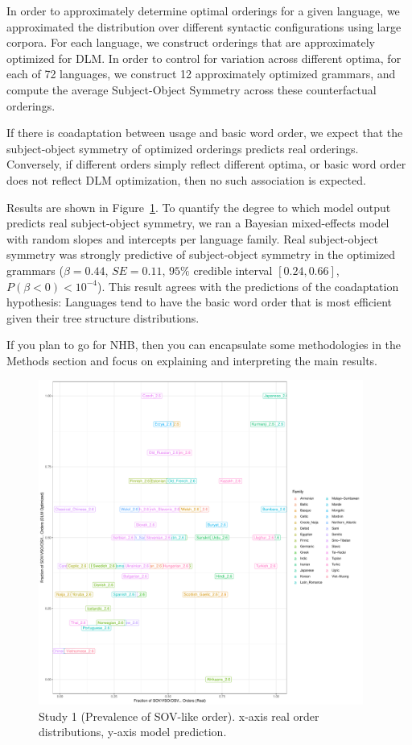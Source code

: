 \documentclass[11pt,a4paper]{article}
\begin{document}
In order to approximately determine optimal orderings for a given language, we approximated the distribution over different syntactic configurations using large corpora.
For each language, we construct orderings that are approximately optimized for DLM.
In order to control for variation across different optima, for each of 72 languages, we construct 12 approximately optimized grammars, and compute the average Subject-Object Symmetry across these counterfactual orderings.

If there is coadaptation between usage and basic word order, we expect that the subject-object symmetry of optimized orderings predicts real orderings.
Conversely, if different orders simply reflect different optima, or basic word order does not reflect DLM optimization, then no such association is expected.

Results are shown in Figure~\ref{fig:study1}.
To quantify the degree to which model output predicts real subject-object symmetry, we ran a Bayesian mixed-effects model with random slopes and intercepts per language family.
Real subject-object symmetry was strongly predictive of subject-object symmetry in the optimized grammars ($\beta = 0.44$, $SE=0.11$, $95\%$ credible interval $[0.24, 0.66]$, $P(\beta<0) < 10^{-4}$).
This result agrees with the predictions of the coadaptation hypothesis: Languages tend to have the basic word order that is most efficient given their tree structure distributions.

{\color{blue} If you plan to go for NHB, then you can encapsulate some methodologies in the Methods section and focus on explaining and interpreting the main results.}


\begin{figure}
    \centering
    \includegraphics[width=0.95\textwidth]{figures/fracion-optimized_DLM_2.6.pdf}
    \caption{Study 1 (Prevalence of SOV-like order). x-axis real order distributions, y-axis model prediction.}
    \label{fig:study1}
\end{figure}
\end{document}
